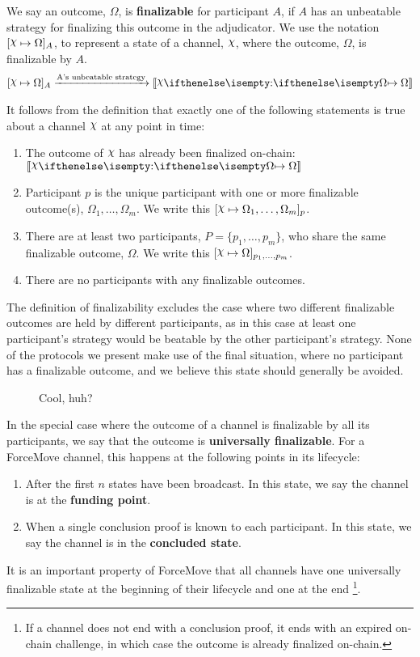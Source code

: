 We say an outcome, $\Omega$, is \textbf{finalizable} for participant $A$, if $A$ has an unbeatable
strategy for finalizing this outcome in the adjudicator.
We use the notation $\finalizable{\rchi}{\Omega}{A}$, to represent a state of a channel, $\rchi$,
where the outcome, $\Omega$, is finalizable by $A$.
\begin{align}
  \finalizable{\rchi}{\Omega}{A} \xrightarrow{\text{A's unbeatable strategy}} \adj{\holds{\rchi}{}{\Omega}}
\end{align}

It follows from the definition that exactly one of the following statements is true about
a channel $\rchi$ at any point in time:
\begin{enumerate}
  \item The outcome of $\rchi$ has already been finalized on-chain: $\adj{\holds{\rchi}{}{\Omega}}$
  \item Participant $p$ is the unique participant with one or more finalizable outcome(s), $\Omega_1, \dots, \Omega_m$.
        We write this $\finalizable{\rchi}{\Omega_1, \dots, \Omega_m}{p}$.
  \item There are at least two participants, $P = \{p_1, \dots, p_m \}$, who share the same
        finalizable outcome, $\Omega$. We write this $\finalizable{\rchi}{\Omega}{p_1, \dots, p_m}$.
  \item There are no participants with any finalizable outcomes.
\end{enumerate}
The definition of finalizability excludes the case where two different finalizable outcomes are held
by different participants, as in this case at least one participant's strategy would be beatable
by the other participant's strategy.
None of the protocols we present make use of the final situation, where no participant has a finalizable outcome, and we believe this state should generally be avoided.

\begin{figure}[h]\centering
  \makebox[\textwidth][c]{}
  \caption{Cool, huh?}
\end{figure}
In the special case where the outcome of a channel is finalizable by all its participants, we say that the outcome is \textbf{universally finalizable}.
For a ForceMove channel, this happens at the following points in its lifecycle:
\begin{enumerate}
  \item After the first $n$ states have been broadcast. In this state, we say the channel is at the \textbf{funding point}.
  \item When a single conclusion proof is known to each participant. In this state, we say the channel is in the \textbf{concluded state}.
\end{enumerate}
It is an important property of ForceMove that all channels have one universally finalizable
state at the beginning of their lifecycle and one at the end
\footnote{If a channel does not end with a conclusion proof, it ends with an expired on-chain challenge,
in which case the outcome is already finalized on-chain.}.

